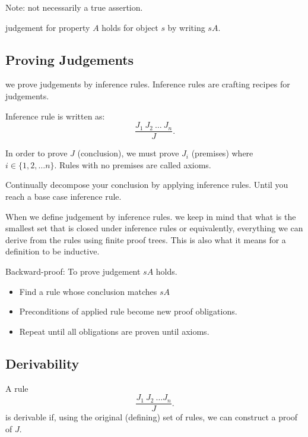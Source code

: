 Note: not necessarily a true assertion.

\begin{notation}
  judgement for property \( A \) holds for object \( s \) by writing \( sA \).
\end{notation}

\subsection{Proving Judgements}

we prove judgements by inference rules. Inference rules are crafting recipes for judgements.

\begin{notation}
  Inference rule is written as:
  \[
    \frac{J_1 \: J_2 \:\ldots \: J_n}{J}
  .\] 

  In order to prove \( J \) (conclusion), we must prove \( J_i \) (premises) where  \( i \in \{1, 2,\ldots n\}   \).
  Rules with no premises are called axioms.
\end{notation}

Continually decompose your conclusion by applying inference rules. Until you reach a base case inference rule.

When we define judgement by inference rules. we keep in mind that what is the 
smallest set that is closed under inference rules or equivalently, 
everything we can derive from the rules using finite proof trees.
This is also what it means for a definition to be inductive.

\begin{definition}
  Backward-proof:
  To prove judgement \( s A \) holds.
  \begin{itemize}
    \item Find a rule whose conclusion matches \( sA \)
    \item Preconditions of applied rule become new proof obligations.
    \item Repeat until all obligations are proven until axioms.
  \end{itemize}
\end{definition}

\subsection{Derivability}

\begin{definition}
  A rule 
  \[
    \frac{J_1 \: J_{2}\: \ldots J_n}{J}
  .\] 
  is derivable if, using the original (defining) set of rules, we can construct a proof of \( J \).
\end{definition}

